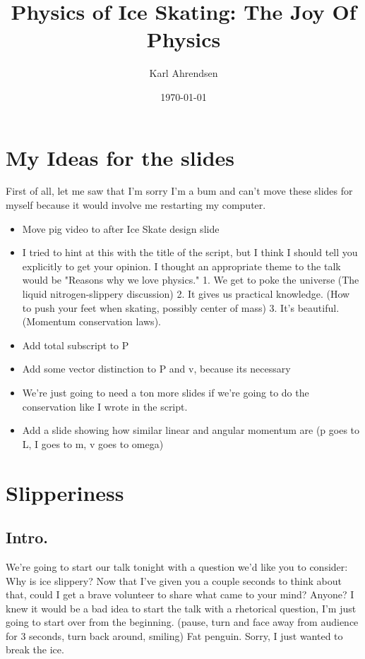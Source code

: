 \documentclass[12pt]{article}
\title{Physics of Ice Skating: The Joy Of Physics}
\author{Karl Ahrendsen}
\date{\today}
\begin{document}
\maketitle
\section*{My Ideas for the slides}
First of all, let me saw that I'm sorry I'm a bum and can't move these 
slides for myself because it would involve me restarting my computer. 
\begin{itemize}
    \item Move pig video to after Ice Skate design slide
    \item I tried to hint at this with the title of the script,
        but I think I should tell you explicitly to get your 
        opinion. I thought an appropriate theme to the talk 
        would be "Reasons why we love physics." 1. We
        get to poke the universe (The liquid nitrogen-slippery
        discussion) 2. It gives us practical knowledge. (How to 
        push your feet when skating, possibly center of mass) 
        3. It's beautiful. (Momentum conservation laws).
    \item Add total subscript to P
    \item Add some vector distinction to P and v, because its necessary
    \item We're just going to need a ton more slides if we're
        going to do the conservation like I wrote in the script. 
    \item Add a slide showing how similar linear and angular
        momentum are (p goes to L, I goes to m, v goes to omega)
\end{itemize}
\section{Slipperiness}
\subsection{Intro.}
We're going to start our talk tonight with a question we'd like you to consider:
Why is ice slippery? Now that I've given you a couple seconds to think about that, 
could I get a brave volunteer to share what came to your mind? Anyone? I knew it would
be a bad idea to start the talk with a rhetorical question, I'm just going to start 
over from the beginning. (pause, turn and face away from audience for 3 seconds, 
turn back around, smiling) Fat penguin. Sorry, I just wanted to break the ice. 
    
\end{document}
